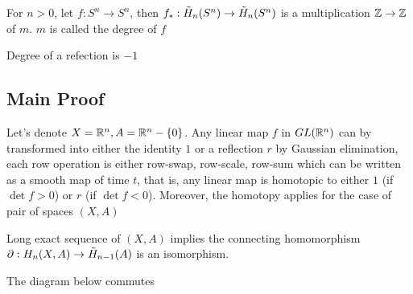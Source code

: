 \documentclass{article}
\begin{document}
\begin{definition}[degree]
    For $n > 0$, let $f: S^n \to S^n$, then $f_*: \Tilde{H}_n(S^n) \to \Tilde{H}_n(S^n)$ is a multiplication $\mathbb{Z} \to \mathbb{Z}$ of $m$. $m$ is called the degree of $f$
\end{definition}

\begin{lemma}
    \label{lemma2}
    Degree of a refection is $-1$
\end{lemma}

\subsection{Main Proof}
Let's denote $X = \mathbb{R}^n, A = \mathbb{R}^n - \{0\}$. Any linear map $f$ in $GL(\mathbb{R}^n)$ can by transformed into either the identity $1$ or a reflection $r$ by Gaussian elimination, each row operation is either row-swap, row-scale, row-sum which can be written as a smooth map of time $t$, that is, any linear map is homotopic to either $1$ (if $\det f > 0$) or $r$ (if $\det f < 0$). Moreover, the homotopy applies for the case of pair of spaces $(X, A)$

Long exact sequence of $(X, A)$ implies the connecting homomorphism $\partial: H_n(X, A) \to \Tilde{H}_{n-1}(A)$ is an isomorphism.

\begin{center}
\end{center}

The diagram below commutes

\begin{center}
\end{center}
\end{document}
